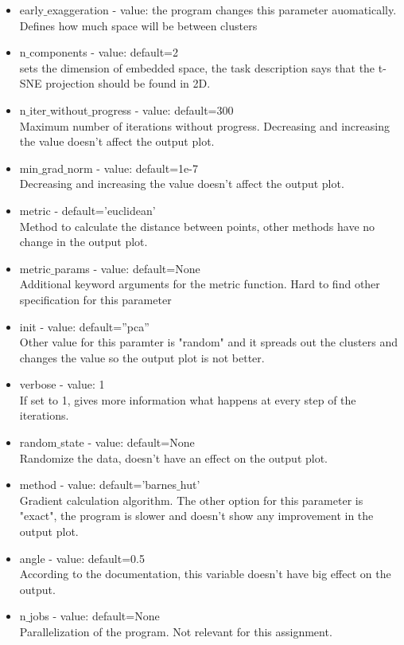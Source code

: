 \documentclass[12pt]{report}
\begin{document}
	\begin{itemize}
		\item early$\_$exaggeration - value: the program changes this parameter auomatically.\\
		Defines how much space will be between clusters
		\item n$\_$components - value: default=2\\
		sets the dimension of embedded space, the task description says that the t-SNE projection should be found in 2D.
		\item n$\_$iter$\_$without$\_$progress - value: default=300\\
		Maximum number of iterations without progress. Decreasing and increasing the value doesn't affect the output plot.
		\item min$\_$grad$\_$norm - value: default=1e-7\\
		Decreasing and increasing the value doesn't affect the output plot.
		\item metric - default=’euclidean’\\
		Method to calculate the distance between points, other methods have no change in the output plot.
		\item metric$\_$params - value: default=None\\
		Additional keyword arguments for the metric function. Hard to find other specification for this parameter
		\item init - value: default=”pca”\\
		Other value for this paramter is "random" and it spreads out the clusters and changes the value so the output plot is not better.
		\item verbose - value: 1\\
		If set to 1, gives more information what happens at every step of the iterations.
		\item random$\_$state - value: default=None\\
		Randomize the data, doesn't have an effect on the output plot.
		\item method - value: default=’barnes$\_$hut’\\
		Gradient calculation algorithm. The other option for this parameter is "exact", the program is slower and doesn't show any improvement in the output plot.
		\item angle - value: default=0.5\\
		According to the documentation, this variable doesn't have big effect on the output.
		\item n$\_$jobs - value: default=None\\
		Parallelization of the program. Not relevant for this assignment.
	\end{itemize}
\end{document}
